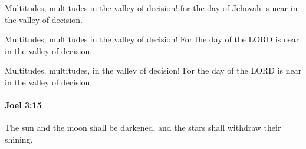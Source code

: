 			\begin{versebox}
					\item[BHS] 
					\item[LXX] 
					\item[ASV] Multitudes, multitudes in the valley of decision! for the day of Jehovah is near in the valley of decision.
					\item[NIV] Multitudes, multitudes in the valley of decision! For the day of the LORD is near in the valley of decision.
					\item[NRSV] Multitudes, multitudes, in the valley of decision! For the day of the LORD is near in the valley of decision.
			\end{versebox}

		\paragraph{Joel 3:15} %
			\label{JOEL-3-15}

			The sun and the moon shall be darkened, and the stars shall withdraw their shining.


